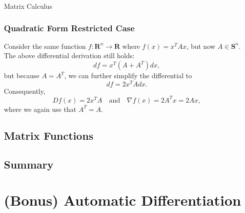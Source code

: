 \begin{chapter}{Matrix Calculus}
    \subsubsection{Quadratic Form Restricted Case}
    Consider the same function $f: \mathbf{R}^n \to \mathbf{R}$ where $f(x) = x^T A x$, but now
    $A \in \textbf{S}^{n}$. The above differential derivation still holds:
    \[df = x^T(A + A^T)dx,\]
    but because $A = A^T$, we can further simplify the differential to
    \[df = 2x^T A dx.\]
    Consequently,
    \[Df(x) = 2x^T A \quad \text{and} \quad \nabla f(x) = 2A^Tx = 2Ax,\]
    where we again use that $A^T = A$.
    \noindent 

    \subsection{Matrix Functions}

    \subsection{Summary}

    \section{(Bonus) Automatic Differentiation}
    
    
\end{chapter}